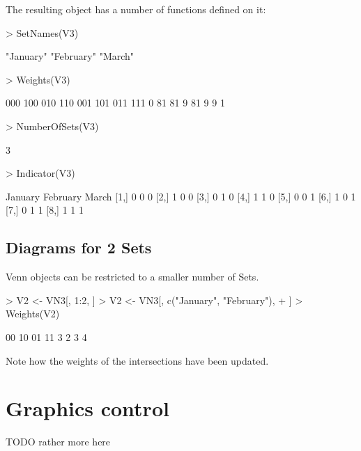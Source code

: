 \documentclass[a4paper]{article}
\begin{document}
The resulting object has a number of functions defined on it:
\begin{Schunk}
\begin{Sinput}
> SetNames(V3)
\end{Sinput}
\begin{Soutput}
[1] "January"  "February" "March"   
\end{Soutput}
\begin{Sinput}
> Weights(V3)
\end{Sinput}
\begin{Soutput}
000 100 010 110 001 101 011 111 
  0  81  81   9  81   9   9   1 
\end{Soutput}
\begin{Sinput}
> NumberOfSets(V3)
\end{Sinput}
\begin{Soutput}
[1] 3
\end{Soutput}
\begin{Sinput}
> Indicator(V3)
\end{Sinput}
\begin{Soutput}
     January February March
[1,]       0        0     0
[2,]       1        0     0
[3,]       0        1     0
[4,]       1        1     0
[5,]       0        0     1
[6,]       1        0     1
[7,]       0        1     1
[8,]       1        1     1
\end{Soutput}
\end{Schunk}



\subsection{Diagrams for 2 Sets}

Venn objects can be restricted to a smaller number of Sets.
\begin{Schunk}
\begin{Sinput}
> V2 <- VN3[, 1:2, ]
> V2 <- VN3[, c("January", "February"), 
+     ]
> Weights(V2)
\end{Sinput}
\begin{Soutput}
00 10 01 11 
 3  2  3  4 
\end{Soutput}
\end{Schunk}
Note how the weights of the intersections have been updated.


\section{Graphics control}
TODO rather more here
\label{sec:graphics}
\end{document}
